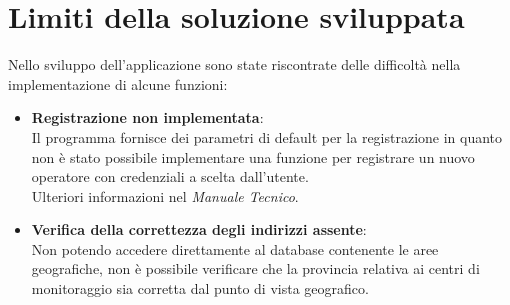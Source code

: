 \documentclass[12pt]{scrreprt}
\begin{document}
	\chapter{Limiti della soluzione sviluppata}
	Nello sviluppo dell'applicazione sono state riscontrate delle difficolt\`a nella implementazione di alcune funzioni:
	\begin{itemize}
		\item \textbf{Registrazione non implementata}:\\Il programma fornisce dei parametri di default per la registrazione in quanto non \`e stato possibile implementare una funzione per registrare un nuovo operatore con credenziali a scelta dall'utente.\\Ulteriori informazioni nel \textsl{Manuale Tecnico}.

		\item \textbf{Verifica della correttezza degli indirizzi assente}:\\Non potendo accedere direttamente al database contenente le aree geografiche, non \`e possibile verificare che la provincia relativa ai centri di monitoraggio sia corretta dal punto di vista geografico.
	\end{itemize}

	\nocite{IuriTex}
	
	
\end{document}
